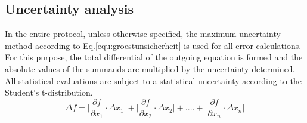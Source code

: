 \subsection{Uncertainty analysis}
\label{sec:unsichi}

In the entire protocol, unless otherwise specified, the maximum uncertainty method according to Eq.\ref{equ:groestunsicherheit} \cite{MMETH} is used for all error calculations.
For this purpose, the total differential of the outgoing equation is formed and the absolute values of the summands are multiplied by the uncertainty determined.
All statistical evaluations are subject to a statistical uncertainty according to the Student's t-distribution.
\begin{equation}
    \varDelta f = \biggl| \frac{\partial f}{\partial x_{1}} \cdot \varDelta x_{1} \biggl| + \biggl| \frac{\partial f}{\partial x_{2}} \cdot \varDelta x_{2} \biggl| + .... + \biggl| \frac{\partial f}{\partial x_{n}} \cdot \varDelta x_{n} \biggl|
    \label{equ:groestunsicherheit}
\end{equation}
\newpage